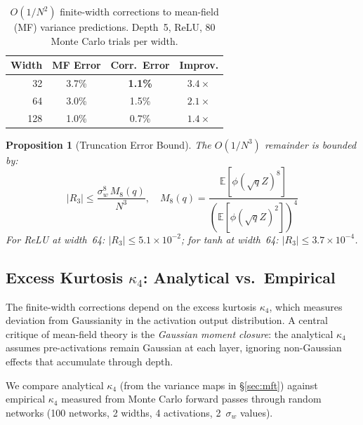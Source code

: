\documentclass[10pt]{article}
\newcommand{\EE}{\mathbb{E}}
\newtheorem{proposition}[theorem]{Proposition}
\begin{document}
\begin{table}[t]
\centering
\caption{$O(1/N^2)$ finite-width corrections to mean-field (MF) variance predictions. Depth~5, ReLU, 80 Monte Carlo trials per width.}
\label{tab:finite-width}
\small
\begin{tabular}{@{}rccc@{}}
\toprule
\textbf{Width} & \textbf{MF Error} & \textbf{Corr.\ Error} & \textbf{Improv.} \\
\midrule
32   & 3.7\% & \textbf{1.1\%}  & $3.4\times$ \\
64   & 3.0\%  & 1.5\%  & $2.1\times$ \\
128  & 1.0\%  & 0.7\%  & $1.4\times$ \\
\bottomrule
\end{tabular}
\end{table}

\begin{proposition}[Truncation Error Bound]
\label{prop:truncation-bound}
The $O(1/N^3)$ remainder is bounded by:
\begin{equation}
    |R_3| \leq \frac{\sigma_w^8\, M_8(q)}{N^3}, \quad M_8(q) = \frac{\EE[\phi(\sqrt{q}Z)^8]}{(\EE[\phi(\sqrt{q}Z)^2])^4}
    \label{eq:truncation-bound}
\end{equation}
For ReLU at width~64: $|R_3| \leq 5.1 \times 10^{-2}$; for tanh at width~64: $|R_3| \leq 3.7 \times 10^{-4}$.
\end{proposition}

\subsection{Excess Kurtosis $\kappa_4$: Analytical vs.\ Empirical}
\label{sec:kappa4-mc}

The finite-width corrections depend on the excess kurtosis $\kappa_4$, which measures deviation from Gaussianity in the activation output distribution.
A central critique of mean-field theory is the \emph{Gaussian moment closure}: the analytical $\kappa_4$ assumes pre-activations remain Gaussian at each layer, ignoring non-Gaussian effects that accumulate through depth.

We compare analytical $\kappa_4$ (from the variance maps in \S\ref{sec:mft}) against empirical $\kappa_4$ measured from Monte Carlo forward passes through random networks (100 networks, 2 widths, 4 activations, 2~$\sigma_w$ values).
\end{document}
